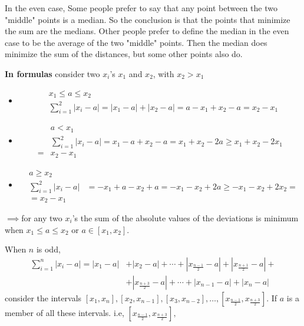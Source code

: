 In the even case, Some people prefer to say that any point between the two "middle" points is a median. So the conclusion is that the points that minimize the sum are the medians. Other people prefer to define the median in the even case to be the average of the two "middle" points. Then the median does minimize the sum of the distances, but some other points also do.

\textbf{In formulas} consider two $x_i$'s $x_1$ and $x_2$, with $x_2>x_1$
\begin{itemize}
\item \begin{equation}\begin{aligned}
&x_1\leq a\leq x_2
\\ &\sum_{i=1}^{2}|x_i-a|=|x_1-a|+|x_2-a|=a-x_1+x_2-a=x_2-x_1
\end{aligned}\end{equation}
\item \begin{equation}\begin{aligned}
&a < x_1
\\&\sum_{i=1}^{2}|x_i-a|=x_1-a+x_2-a=x_1+x_2-2a\ge x_1+x_2-2x_1\\=&x_2-x_1
\end{aligned}\end{equation}
\item \begin{equation}\begin{aligned}
&a\ge x_2
\\&\sum_{i=1}^{2}|x_i-a|&=-x_1+a-x_2+a=-x_1-x_2+2a\ge -x_1-x_2+2x_2=\\
&=x_2 - x_1
\end{aligned}
\end{equation}

\end{itemize}


$\implies$for any two $x_i$'s the sum of the absolute values of the deviations is minimum when $x_1\leq a\leq x_2$ or $a\in[x_1,x_2]$.

When $n$ is odd,
\begin{equation}
\begin{aligned}
\sum_{i=1}^n\left|x_i-a\right|=\left|x_1-a\right|&+\left|x_2-a\right|+\cdots+\left|x_{\tfrac{n-1}{2}}-a\right| + \left|x_{\tfrac{n+1}{2}}-a\right|+\\
&+ \left|x_{\tfrac{n+3}{2}}-a\right|+ \cdots+\left|x_{n-1}-a\right|+\left|x_n-a\right|
\end{aligned}
\end{equation}
consider the intervals $[x_1,x_n], [x_2,x_{n-1}], [x_3,x_{n-2}], \ldots, \left[x_{\tfrac{n-1}{2}}, x_{\tfrac{n+3}{2}}\right]$. If $a$ is a member of all these intervals. i.e, $\left[x_{\tfrac{n-1}{2}},x_{\tfrac{n+3}{2}}\right],$

